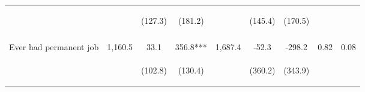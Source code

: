\begin{tabular}{lcccccccc}
 & \begin{footnotesize}\end{footnotesize} & \begin{footnotesize}(127.3)\end{footnotesize} & \begin{footnotesize}(181.2)\end{footnotesize} & \begin{footnotesize}\end{footnotesize} & \begin{footnotesize}(145.4)\end{footnotesize} & \begin{footnotesize}(170.5)\end{footnotesize} & \begin{footnotesize}\end{footnotesize} & \begin{footnotesize}\end{footnotesize}\\
 & \begin{footnotesize}\end{footnotesize} & \begin{footnotesize}[1.000]\end{footnotesize} & \begin{footnotesize}[0.045]\end{footnotesize} & \begin{footnotesize}\end{footnotesize} & \begin{footnotesize}[1.000]\end{footnotesize} & \begin{footnotesize}[0.479]\end{footnotesize} & \begin{footnotesize}\end{footnotesize} & \begin{footnotesize}\end{footnotesize}\\
\noalign{\smallskip}Ever had permanent job & 1,160.5 & 33.1 & 356.8*** & 1,687.4 & -52.3 & -298.2 & 0.82 & 0.08\\
 & \begin{footnotesize}\end{footnotesize} & \begin{footnotesize}(102.8)\end{footnotesize} & \begin{footnotesize}(130.4)\end{footnotesize} & \begin{footnotesize}\end{footnotesize} & \begin{footnotesize}(360.2)\end{footnotesize} & \begin{footnotesize}(343.9)\end{footnotesize} & \begin{footnotesize}\end{footnotesize} & \begin{footnotesize}\end{footnotesize}\\

\end{tabular}

